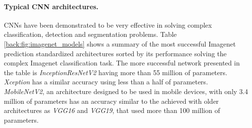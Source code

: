 \paragraph{Typical CNN architectures.} CNNs have been demonstrated to be very effective in solving complex classification, detection and segmentation problems. Table \ref{back:fig:imagenet_models} shows a summary of the most successful Imagenet \citep{imagenet_cvpr09} prediction standardized architectures sorted by its performance solving the complex Imagenet classification task. The more successful network presented in the table is \emph{InceptionResNetV2} having more than 55 million of parameters. \emph{Xception} has a similar accuracy using less than a half of parameters. \emph{MobileNetV2}, an architecture designed to be used in mobile devices, with only 3.4 million of parameters has an accuracy similar to the achieved with older architectures as \emph{VGG16} and \emph{VGG19}, that used more than 100 million of parameters.

